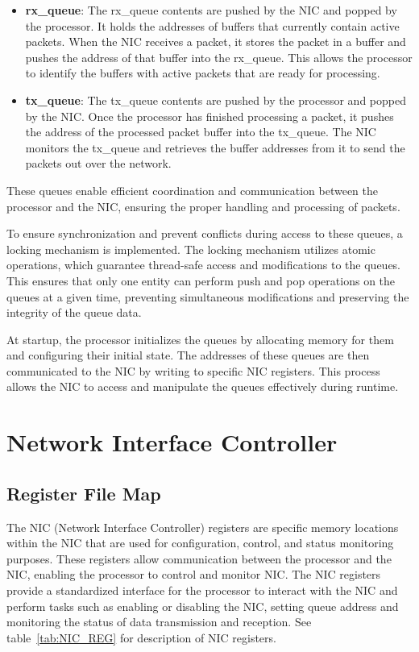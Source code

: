 \documentclass[12pt]{report}
\begin{document}
\begin{appendices}
\begin{itemize}
		\item \textbf{rx\_queue}: The rx\_queue contents are pushed by the NIC and popped by the processor. It holds the addresses of buffers that currently contain active packets. When the NIC receives a packet, it stores the packet in a buffer and pushes the address of that buffer into the rx\_queue. This allows the processor to identify the buffers with active packets that are ready for processing. \\

		\item \textbf{tx\_queue}: The tx\_queue contents are pushed by the processor and popped by the NIC. Once the processor has finished processing a packet, it pushes the address of the processed packet buffer into the tx\_queue. The NIC monitors the tx\_queue and retrieves the buffer addresses from it to send the packets out over the network.\\
	\end{itemize}

These queues enable efficient coordination and communication between the processor and the NIC, ensuring the proper handling and processing of packets.

To ensure synchronization and prevent conflicts during access to these queues, a locking mechanism is implemented. The locking mechanism utilizes atomic operations, which guarantee thread-safe access and modifications to the queues. This ensures that only one entity can perform push and pop operations on the queues at a given time, preventing simultaneous modifications and preserving the integrity of the queue data.


At startup, the processor initializes the queues by allocating memory for them and configuring their initial state. The addresses of these queues are then communicated to the NIC by writing to specific NIC registers. This process allows the NIC to access and manipulate the queues effectively during runtime. 


	\section{Network Interface Controller}
		


		\subsection{Register File Map} \label{subsec:NIC_REG}
				The NIC (Network Interface Controller) registers are specific memory locations within the NIC that are used for configuration, control, and status monitoring purposes. These registers allow communication between the processor and the NIC, enabling the processor to control and monitor NIC. The NIC registers provide a standardized interface for the processor to interact with the NIC and perform tasks such as enabling or disabling the NIC, setting queue address and monitoring the status of data transmission and reception. See table~\ref{tab:NIC_REG} for description of NIC registers.


\end{appendices}
\end{document}
